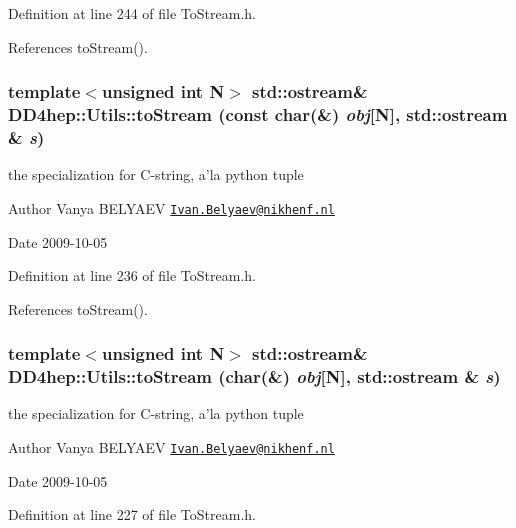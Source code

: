 Definition at line 244 of file ToStream.h.

References toStream().\hypertarget{namespace_d_d4hep_1_1_utils_aad9c223ff08f471324e0257468289c01}{
\subsubsection[{toStream}]{\setlength{\rightskip}{0pt plus 5cm}template$<$unsigned int N$>$ std::ostream\& DD4hep::Utils::toStream (const char(\&) {\em obj}\mbox{[}N\mbox{]}, \/  std::ostream \& {\em s})}}
\label{namespace_d_d4hep_1_1_utils_aad9c223ff08f471324e0257468289c01}
the specialization for C-\/string, a'la python tuple \begin{DoxyAuthor}{Author}
Vanya BELYAEV \href{mailto:Ivan.Belyaev@nikhenf.nl}{\tt Ivan.Belyaev@nikhenf.nl} 
\end{DoxyAuthor}
\begin{DoxyDate}{Date}
2009-\/10-\/05 
\end{DoxyDate}


Definition at line 236 of file ToStream.h.

References toStream().\hypertarget{namespace_d_d4hep_1_1_utils_a89f3b379db439ae144994545375dbe7e}{
\subsubsection[{toStream}]{\setlength{\rightskip}{0pt plus 5cm}template$<$unsigned int N$>$ std::ostream\& DD4hep::Utils::toStream (char(\&) {\em obj}\mbox{[}N\mbox{]}, \/  std::ostream \& {\em s})}}
\label{namespace_d_d4hep_1_1_utils_a89f3b379db439ae144994545375dbe7e}
the specialization for C-\/string, a'la python tuple \begin{DoxyAuthor}{Author}
Vanya BELYAEV \href{mailto:Ivan.Belyaev@nikhenf.nl}{\tt Ivan.Belyaev@nikhenf.nl} 
\end{DoxyAuthor}
\begin{DoxyDate}{Date}
2009-\/10-\/05 
\end{DoxyDate}


Definition at line 227 of file ToStream.h.

